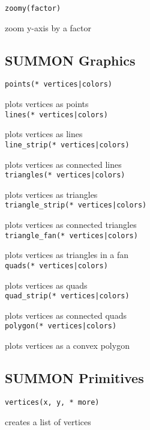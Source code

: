 {\tt zoomy(factor) }

zoom y-axis by a factor \\


\subsection{ SUMMON Graphics }

{\tt points(* vertices|colors) }

plots vertices as points \\


{\tt lines(* vertices|colors) }

plots vertices as lines \\


{\tt line\_strip(* vertices|colors) }

plots vertices as connected lines \\


{\tt triangles(* vertices|colors) }

plots vertices as triangles \\


{\tt triangle\_strip(* vertices|colors) }

plots vertices as connected triangles \\


{\tt triangle\_fan(* vertices|colors) }

plots vertices as triangles in a fan \\


{\tt quads(* vertices|colors) }

plots vertices as quads \\


{\tt quad\_strip(* vertices|colors) }

plots vertices as connected quads \\


{\tt polygon(* vertices|colors) }

plots vertices as a convex polygon \\


\subsection{ SUMMON Primitives }

{\tt vertices(x, y, * more) }

creates a list of vertices \\


